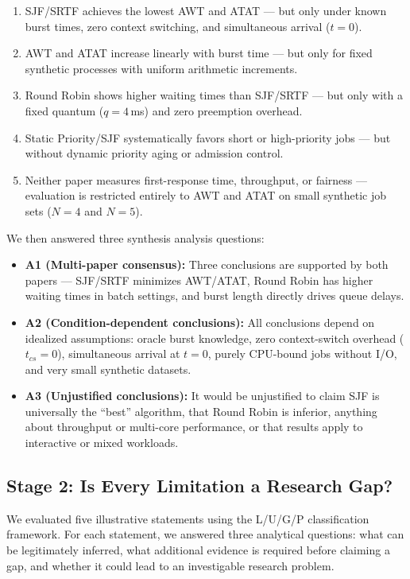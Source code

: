 \documentclass[11pt, a4paper]{article}
\begin{document}
\begin{enumerate}[nosep]
    \item SJF/SRTF achieves the lowest AWT and ATAT --- but only under known burst times, zero context switching, and simultaneous arrival ($t=0$).
    \item AWT and ATAT increase linearly with burst time --- but only for fixed synthetic processes with uniform arithmetic increments.
    \item Round Robin shows higher waiting times than SJF/SRTF --- but only with a fixed quantum ($q=4$\,ms) and zero preemption overhead.
    \item Static Priority/SJF systematically favors short or high-priority jobs --- but without dynamic priority aging or admission control.
    \item Neither paper measures first-response time, throughput, or fairness --- evaluation is restricted entirely to AWT and ATAT on small synthetic job sets ($N=4$ and $N=5$).
\end{enumerate}

We then answered three synthesis analysis questions:
\begin{itemize}[nosep]
    \item \textbf{A1 (Multi-paper consensus):} Three conclusions are supported by both papers --- SJF/SRTF minimizes AWT/ATAT, Round Robin has higher waiting times in batch settings, and burst length directly drives queue delays.
    \item \textbf{A2 (Condition-dependent conclusions):} All conclusions depend on idealized assumptions: oracle burst knowledge, zero context-switch overhead ($t_{cs}=0$), simultaneous arrival at $t=0$, purely CPU-bound jobs without I/O, and very small synthetic datasets.
    \item \textbf{A3 (Unjustified conclusions):} It would be unjustified to claim SJF is universally the ``best'' algorithm, that Round Robin is inferior, anything about throughput or multi-core performance, or that results apply to interactive or mixed workloads.
\end{itemize}

\subsection{Stage 2: Is Every Limitation a Research Gap?}
We evaluated five illustrative statements using the L/U/G/P classification framework. For each statement, we answered three analytical questions: what can be legitimately inferred, what additional evidence is required before claiming a gap, and whether it could lead to an investigable research problem.
\end{document}
